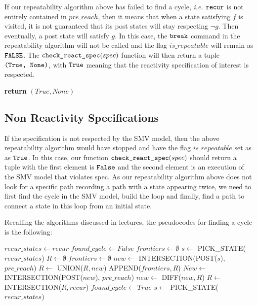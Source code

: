 If our repeatability algorithm above has failed to find a cycle, \emph{i.e.} $\verb|recur|$ is not entirely contained in $pre\_reach$, then it means that when a state satisfying $f$ is visited, it is not guaranteed that its post states will stay respecting $\neg g$. Then eventually, a post state will satisfy $g$. In this case, the $\verb|break|$ command in the repeatability algorithm will not be called and the flag $is\_repeatable$ will remain as $\verb|FALSE|$. The $\verb|check_react_spec|(spec)$ function will then return a tuple $\verb|(True, None)|$, with $\verb|True|$ meaning that the reactivity specification of interest is respected.

\begin{algorithmic}[1]
    \State \textbf{return }$(True, None)$
\EndIf
\end{algorithmic}

\subsection{Non Reactivity Specifications}

If the specification is not respected by the SMV model, then the above repeatability algorithm would have stopped and have the flag $is\_repeatable$ set as as $\verb|True|$. In this case, our function $\verb|check_react_spec|(spec)$ should return a tuple with the first element is $\verb|False|$ and the second element is an execution of the SMV model that violates spec. As our repeatability algorithm above does not look for a specific path recording a path with a state appearing twice, we need to first find the cycle in the SMV model, build the loop and finally, find a path to connect a state in this loop from an initial state.

Recalling the algorithms discussed in lectures, the pseudocodes for finding a cycle is the following:

\begin{algorithmic}[1]
\State $recur\_states \leftarrow recur$
\State $found\_cycle \leftarrow False$
\State $frontiers \leftarrow \emptyset$
\State $s\leftarrow$ PICK\_STATE($recur\_states$)
    \State $R \leftarrow \emptyset$
    \State $frontiers \leftarrow \emptyset$
    \State $new \leftarrow $ INTERSECTION(POST($s$), $pre\_reach$)
        \State $R \leftarrow$ UNION($R, new$)
        \State APPEND($frontiers, R$)
        \State $New \leftarrow$ INTERSECTION(POST($new$), $pre\_reach$)
        \State $new \leftarrow$ DIFF($new, R$)
    \EndWhile
    \State $R\leftarrow$ INTERSECTION($R, recur$)
        \State $found\_cycle \leftarrow True$
    \Else
        \State $s \leftarrow$ PICK\_STATE($recur\_states$)
    \EndIf
\EndWhile
\end{algorithmic}


